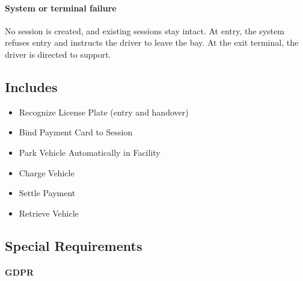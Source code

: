 \documentclass[11pt,a4paper]{article}
\begin{document}
\paragraph{System or terminal failure}
No session is created, and existing sessions stay intact. At entry, the
system refuses entry and instructs the driver to leave the bay. At the
exit terminal, the driver is directed to support.

\subsection*{Includes}

\begin{itemize}
    \item Recognize License Plate (entry and handover)
    \item Bind Payment Card to Session
    \item Park Vehicle Automatically in Facility
    \item Charge Vehicle
    \item Settle Payment
    \item Retrieve Vehicle
\end{itemize}

\subsection*{Special Requirements}

\paragraph{GDPR}
\end{document}
